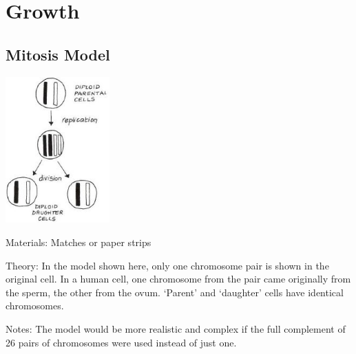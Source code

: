 \section{Growth}

\begin{multicols}{2}


\subsection{Mitosis Model} %

\begin{center}
\includegraphics[width=0.3\textwidth]{./img/vso/mitosis-model.jpg}
\end{center}

\begin{description*}
\item[Materials:]{Matches or paper strips}
\item[Theory:]{In the model shown here, only
one chromosome pair is shown in
the original cell. In a human cell,
one chromosome from the pair
came originally from the sperm,
the other from the ovum. `Parent'
and `daughter' cells have identical
chromosomes.}
\item[Notes:]{The model would be more
realistic and complex if the full
complement of 26 pairs of
chromosomes were used instead
of just one.}
\end{description*}



\end{multicols}
